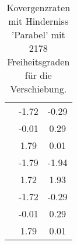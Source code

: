 \begin{table}
\begin{tabular}{c|cc|}
\multicolumn{1}{|c|}{} & \multicolumn{1}{|c|}{     -1.72} & \multicolumn{1}{|c|}{     -0.29} \\ 
\multicolumn{1}{|c|}{} & \multicolumn{1}{|c|}{     -0.01} & \multicolumn{1}{|c|}{      0.29} \\ 
\multicolumn{1}{|c|}{} & \multicolumn{1}{|c|}{      1.79} & \multicolumn{1}{|c|}{      0.01} \\ 
\multicolumn{1}{|c|}{} & \multicolumn{1}{|c|}{     -1.79} & \multicolumn{1}{|c|}{     -1.94} \\ 
\multicolumn{1}{|c|}{} & \multicolumn{1}{|c|}{      1.72} & \multicolumn{1}{|c|}{      1.93} \\ 
\multicolumn{1}{|c|}{} & \multicolumn{1}{|c|}{     -1.72} & \multicolumn{1}{|c|}{     -0.29} \\ 
\multicolumn{1}{|c|}{} & \multicolumn{1}{|c|}{     -0.01} & \multicolumn{1}{|c|}{      0.29} \\ 
\multicolumn{1}{|c|}{} & \multicolumn{1}{|c|}{      1.79} & \multicolumn{1}{|c|}{      0.01} \\ 
\hline 
\end{tabular}\caption{Kovergenzraten mit Hinderniss 'Parabel' mit 2178 Freiheitsgraden für die Verschiebung.}\label{tab:Rate_Parabel_level4}
\end{table} 
